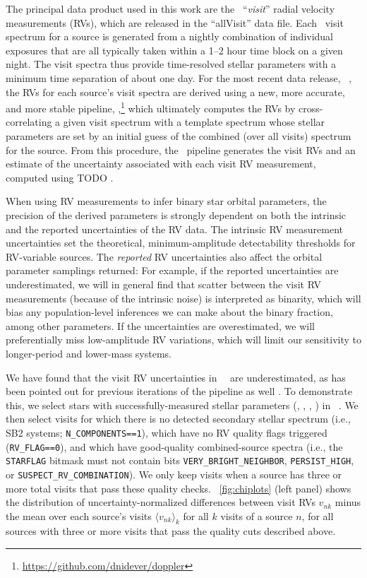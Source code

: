 \documentclass[modern]{aastex63}
\newcommand{\visit}{\textit{visit}}
\newcommand{\thisdr}{\dr{17}}
\begin{document}
The principal data product used in this work are the \apogee\ ``\visit'' radial
velocity measurements (RVs), which are released in the ``allVisit'' data file.
Each \apogee\ visit spectrum for a source is generated from a nightly
combination of individual exposures that are all typically taken within a 1--2
hour time block on a given night.
The visit spectra thus provide time-resolved stellar parameters with a minimum
time separation of about one day.
For the most recent data release, \apogee\ \thisdr, the RVs for
each source's visit spectra are derived using a new, more accurate, and more
stable pipeline,
,\footnote{\url{https://github.com/dnidever/doppler}}
which ultimately computes the RVs by cross-correlating a given visit spectrum
with a template spectrum whose stellar parameters are set by an initial guess of
the combined (over all visits) spectrum for the source.
From this procedure, the \apogee\ pipeline generates the visit RVs and an
estimate of the uncertainty associated with each visit RV measurement, computed
using TODO \citep{TODO}.

When using RV measurements to infer binary star orbital parameters, the
precision of the derived parameters is strongly dependent on both the intrinsic
and the reported uncertainties of the RV data.
The intrinsic RV measurement uncertainties set the theoretical,
minimum-amplitude detectability thresholds for RV-variable sources.
The \emph{reported} RV uncertainties also affect the orbital parameter samplings
returned:
For example, if the reported uncertainties are underestimated, we will in
general find that scatter between the visit RV measurements (because of the
intrinsic noise) is interpreted as binarity, which will bias any
population-level inferences we can make about the binary fraction, among other
parameters.
If the uncertainties are overestimated, we will preferentially miss
low-amplitude RV variations, which will limit our sensitivity to longer-period
and lower-mass systems.

We have found that the visit RV uncertainties in \apogee\ \thisdr\ are
underestimated, as has been pointed out for previous iterations of the pipeline
as well \citep[e.g.,][]{TODO, BadenesIthink, Price-Whelan:2020}.
To demonstrate this, we select stars with successfully-measured stellar
parameters (\logg, \Teff, \mh, \vsini) in \apogee\ \thisdr.
We then select visits for which there is no detected secondary stellar spectrum
(i.e., SB2 systems; \texttt{N\_COMPONENTS==1}), which have no RV quality flags
triggered (\texttt{RV\_FLAG==0}), and which have good-quality combined-source
spectra (i.e., the \texttt{STARFLAG} bitmask must not contain bits
\texttt{VERY\_BRIGHT\_NEIGHBOR}, \texttt{PERSIST\_HIGH}, or
\texttt{SUSPECT\_RV\_COMBINATION}).
We only keep visits when a source has three or more total visits that pass these
quality checks.
\figurename~\ref{fig:chiplots} (left panel) shows the distribution of
uncertainty-normalized differences between visit RVs $v_{nk}$ minus the mean
over each source's visits $\langle v_{nk} \rangle_k$ for all $k$ visits of a
source $n$, for all sources with three or more visits that pass the quality cuts
described above.
\end{document}
